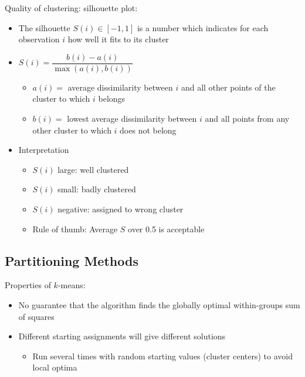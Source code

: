 \documentclass[a4paper]{article}
\begin{document}
Quality of clustering: silhouette plot:
\begin{itemize}
    \item The silhouette $S(i)\in[-1, 1]$ is a number which indicates for each observation $i$ how well it fits to its cluster
    \item $S(i)=\dfrac{b(i)-a(i)}{\max(a(i), b(i))}$
    \begin{itemize}
        \item $a(i)=$ average dissimilarity between $i$ and all other points of the cluster to which $i$ belongs
        \item $b(i)=$ lowest average dissimilarity between $i$ and all points from any other cluster to which $i$ does not belong
    \end{itemize}
    \item Interpretation
    \begin{itemize}
        \item $S(i)$ large: well clustered
        \item $S(i)$ small: badly clustered
        \item $S(i)$ negative: assigned to wrong cluster
        \item Rule of thumb: Average $S$ over 0.5 is acceptable
    \end{itemize}
\end{itemize}

\subsection{Partitioning Methods}

Properties of $k$-means:
\begin{itemize}
    \item No guarantee that the algorithm finds the globally optimal within-groups sum of squares
    \item Different starting assignments will give different solutions
    \begin{itemize}
        \item Run several times with random starting values (cluster centers) to avoid local optima
    \end{itemize}
\end{itemize}
\end{document}
